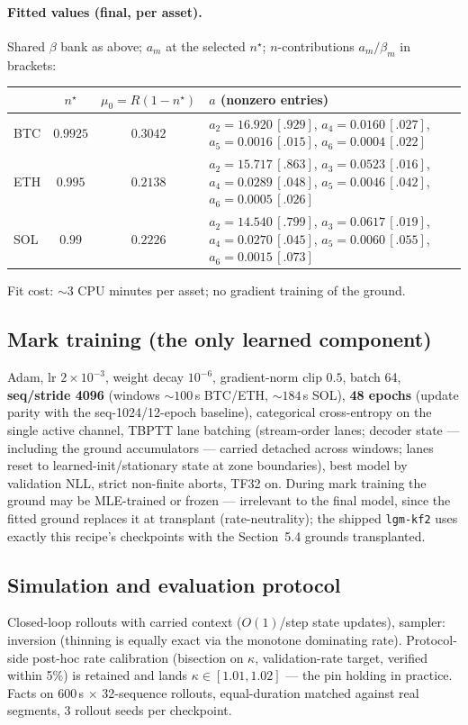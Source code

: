 \documentclass[11pt]{article}
\begin{document}
\paragraph{Fitted values (final, per asset).} Shared $\beta$ bank as above;
$a_m$ at the selected $n^\star$; $n$-contributions $a_m/\beta_m$ in brackets:
\begin{center}\footnotesize
\begin{tabular}{lccp{8.6cm}}
\toprule
 & $n^\star$ & $\mu_0=R(1-n^\star)$ & $a$ (nonzero entries) \\
\midrule
BTC & $0.9925$ & $0.3042$ &
$a_2{=}16.920\,[.929]$, $a_4{=}0.0160\,[.027]$, $a_5{=}0.0016\,[.015]$, $a_6{=}0.0004\,[.022]$\\
ETH & $0.995$ & $0.2138$ &
$a_2{=}15.717\,[.863]$, $a_3{=}0.0523\,[.016]$, $a_4{=}0.0289\,[.048]$, $a_5{=}0.0046\,[.042]$, $a_6{=}0.0005\,[.026]$\\
SOL & $0.99$ & $0.2226$ &
$a_2{=}14.540\,[.799]$, $a_3{=}0.0617\,[.019]$, $a_4{=}0.0270\,[.045]$, $a_5{=}0.0060\,[.055]$, $a_6{=}0.0015\,[.073]$\\
\bottomrule
\end{tabular}
\end{center}
Fit cost: ${\sim}3$ CPU minutes per asset; no gradient training of the ground.

\subsection{Mark training (the only learned component)}
Adam, lr $2\times10^{-3}$, weight decay $10^{-6}$, gradient-norm clip $0.5$,
batch 64, \textbf{seq/stride 4096} (windows ${\sim}100$\,s BTC/ETH,
${\sim}184$\,s SOL), \textbf{48 epochs} (update parity with the seq-1024/12-epoch
baseline), categorical cross-entropy on the single active channel, TBPTT lane
batching (stream-order lanes; decoder state --- including the ground
accumulators --- carried detached across windows; lanes reset to
learned-init/stationary state at zone boundaries), best model by validation
NLL, strict non-finite aborts, TF32 on. During mark training the ground may be
MLE-trained or frozen --- irrelevant to the final model, since the fitted
ground replaces it at transplant (rate-neutrality); the shipped \texttt{lgm-kf2}
uses exactly this recipe's checkpoints with the Section~5.4 grounds
transplanted.

\subsection{Simulation and evaluation protocol}
Closed-loop rollouts with carried context ($O(1)$/step state updates), sampler:
inversion (thinning is equally exact via the monotone dominating rate).
Protocol-side post-hoc rate calibration (bisection on $\kappa$, validation-rate
target, verified within 5\%) is retained and lands $\kappa\in[1.01,1.02]$ ---
the pin holding in practice. Facts on 600\,s $\times$ 32-sequence rollouts,
equal-duration matched against real segments, 3 rollout seeds per checkpoint.
\end{document}
